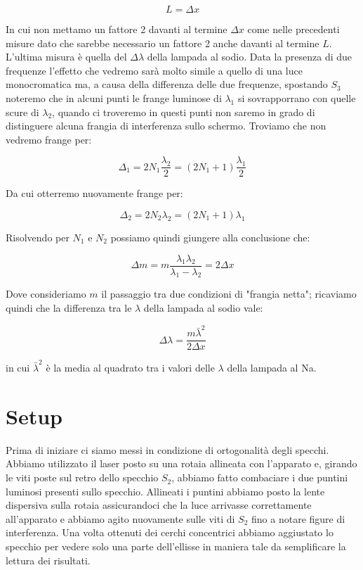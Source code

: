 \documentclass{article}
\begin{document}
\begin{equation} 
L = \Delta{x} 
\end{equation}

In cui non mettamo un fattore 2 davanti al termine $\Delta{x}$ come nelle precedenti misure dato che sarebbe necessario un fattore 2 anche davanti al termine $L$.
L'ultima misura è quella del $\Delta\lambda$ della lampada al sodio. Data la presenza di due frequenze l'effetto che vedremo sarà molto simile a quello di una luce monocromatica ma, a causa della differenza delle due frequenze, spostando $S_3$ noteremo che in alcuni punti le frange luminose di $\lambda_1$ si sovrapporrano con quelle scure di $\lambda_2$, quando ci troveremo in questi punti non saremo in grado di distinguere alcuna frangia di interferenza sullo schermo. Troviamo che non vedremo frange per:

\begin{equation} 
\Delta_1 = 2 N_1 \frac{\lambda_2}{2} = (2 N_1 + 1) \frac{\lambda_1}{2} 
\end{equation}

Da cui otterremo nuovamente frange per:

\begin{equation} 
\Delta_2 = 2N_2 \lambda_2 =(2 N_1 + 1) \lambda_1 
\end{equation}

Risolvendo per $N_1$ e $N_2$ possiamo quindi giungere alla conclusione che:

\begin{equation} 
\Delta m = m \frac{\lambda_1 \lambda_2}{\lambda_1 {-} \lambda_2} = 2 \Delta{x} 
\end{equation}

Dove consideriamo $m$ il passaggio tra due condizioni di "frangia netta"; ricaviamo quindi che la differenza tra le $\lambda$ della lampada al sodio vale:

\begin{equation} 
\Delta{\lambda} = \frac{m \bar \lambda^2}{2 \Delta{x}} 
\end{equation}

in cui $ \bar \lambda^2$ è la media al quadrato tra i valori delle $\lambda$ della lampada al Na.




\section{Setup}
Prima di iniziare ci siamo messi in condizione di ortogonalità degli specchi. Abbiamo utilizzato il laser posto su una rotaia allineata con l'apparato e, girando le viti poste sul retro dello specchio $S_2$, abbiamo fatto combaciare i due puntini luminosi presenti sullo specchio. Allineati i puntini abbiamo posto la lente dispersiva sulla rotaia assicurandoci che la luce arrivasse correttamente all'apparato e abbiamo agito nuovamente sulle viti di $S_2$ fino a notare figure di interferenza. Una volta ottenuti dei cerchi concentrici abbiamo aggiustato lo specchio per vedere solo una parte dell'ellisse in maniera tale da semplificare la lettura dei risultati.
\end{document}
